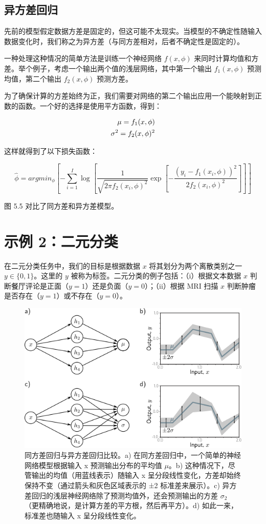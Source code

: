 \subsection{异方差回归}

先前的模型假定数据方差是固定的，但这可能不太现实。当模型的不确定性随输入数据变化时，我们称之为异方差（与同方差相对，后者不确定性是固定的）。

一种处理这种情况的简单方法是训练一个神经网络 \(f(x, \phi)\) 来同时计算均值和方差。举个例子，考虑一个输出两个值的浅层网络，其中第一个输出 \(f_1(x, \phi)\) 预测均值，第二个输出 \(f_2(x, \phi)\) 预测方差。

为了确保计算的方差始终为正，我们需要对网络的第二个输出应用一个能映射到正数的函数。一个好的选择是使用平方函数，得到：


\begin{align}
	\mu = f_1(x, \phi)  \notag \\
	\sigma^2 = f_2(x, \phi)^2  
\end{align}

这样就得到了以下损失函数：

\begin{equation}
	\hat{\phi} = argmin_{\phi} \left[ -\sum_{i=1}^{I} \log \left[ \frac{1}{\sqrt{2\pi f_2(x_i, \phi)^2}} \exp \left[ -\frac{(y_i - f_1(x_i, \phi))^2}{2f_2(x_i, \phi)^2} \right] \right] \right] 
\end{equation}

图 5.5 对比了同方差和异方差模型。

\section{示例 2：二元分类}

在二元分类任务中，我们的目标是根据数据 \(x\) 将其划分为两个离散类别之一 \(y \in \{0, 1\}\)。这里的 \(y\) 被称为标签。二元分类的例子包括：（i）根据文本数据 \(x\) 判断餐厅评论是正面（\(y = 1\)）还是负面（\(y = 0\)）；（ii）根据 MRI 扫描 \(x\) 判断肿瘤是否存在（\(y = 1\)）或不存在（\(y = 0\)）。

\begin{figure}[ht!]
	\centering
	\includegraphics[width=0.7\linewidth]{png/chapter5/LossHeteroscedastic.png}
	\caption{同方差回归与异方差回归比较。a) 在同方差回归中，一个简单的神经网络模型根据输入 x 预测输出分布的平均值 \(\mu\)。b) 这种情况下，尽管输出的均值（用蓝线表示）随输入 x 呈分段线性变化，方差却始终保持不变（通过箭头和灰色区域表示的 ±2 标准差来展示）。c) 异方差回归的浅层神经网络除了预测均值外，还会预测输出的方差 \(\sigma_2\)（更精确地说，是计算方差的平方根，然后再平方）。d) 如此一来，标准差也随输入 x 呈分段线性变化。}
\end{figure}

